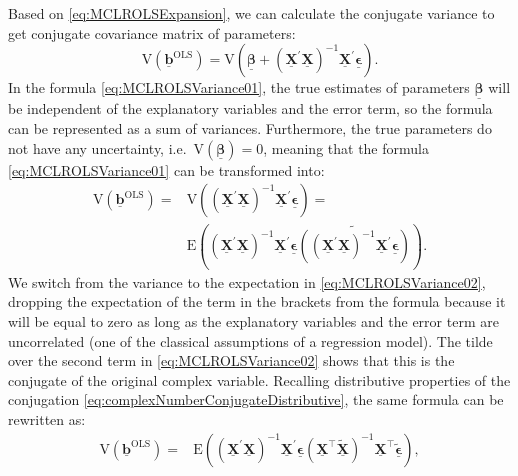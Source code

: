 \documentclass[
]{book}
\begin{document}
Based on \eqref{eq:MCLROLSExpansion}, we can calculate the conjugate variance to get conjugate covariance matrix of parameters:
\begin{equation}
    \mathrm{V}\left( \underline{\boldsymbol{b}}^{\text{OLS}} \right) = \mathrm{V}\left( \underline{\boldsymbol{\beta}} + \left( \underline{\mathbf{X}}^\prime \underline{\mathbf{X}} \right)^{-1} \underline{\mathbf{X}}^\prime \underline{\boldsymbol{\epsilon}} \right) .
    \label{eq:MCLROLSVariance01}
\end{equation}
In the formula \eqref{eq:MCLROLSVariance01}, the true estimates of parameters \(\underline{\boldsymbol{\beta}}\) will be independent of the explanatory variables and the error term, so the formula can be represented as a sum of variances. Furthermore, the true parameters do not have any uncertainty, i.e.~\(\mathrm{V}\left( \underline{\boldsymbol{\beta}} \right) = 0\), meaning that the formula \eqref{eq:MCLROLSVariance01} can be transformed into:
\begin{equation}
    \begin{aligned}
        \mathrm{V}\left( \underline{\boldsymbol{b}}^{\text{OLS}} \right) =
        & \mathrm{V}\left(\left( \underline{\mathbf{X}}^\prime \underline{\mathbf{X}} \right)^{-1} \underline{\mathbf{X}}^\prime \underline{\boldsymbol{\epsilon}} \right) = \\
        & \mathrm{E}\left( \left( \underline{\mathbf{X}}^\prime \underline{\mathbf{X}} \right)^{-1} \underline{\mathbf{X}}^\prime \underline{\boldsymbol{\epsilon}} \widetilde{ \left( \left( \underline{\mathbf{X}}^\prime \underline{\mathbf{X}} \right)^{-1} \underline{\mathbf{X}}^\prime \underline{\boldsymbol{\epsilon}}\right)} \right) .
    \end{aligned}
    \label{eq:MCLROLSVariance02}
\end{equation}
We switch from the variance to the expectation in \eqref{eq:MCLROLSVariance02}, dropping the expectation of the term in the brackets from the formula because it will be equal to zero as long as the explanatory variables and the error term are uncorrelated (one of the classical assumptions of a regression model). The tilde over the second term in \eqref{eq:MCLROLSVariance02} shows that this is the conjugate of the original complex variable. Recalling distributive properties of the conjugation \eqref{eq:complexNumberConjugateDistributive}, the same formula can be rewritten as:
\begin{equation}
    \begin{aligned}
        \mathrm{V}\left( \underline{\boldsymbol{b}}^{\text{OLS}} \right) =
        & \mathrm{E}\left( \left( \underline{\mathbf{X}}^\prime \underline{\mathbf{X}} \right)^{-1} \underline{\mathbf{X}}^\prime \underline{\boldsymbol{\epsilon}} \left( \underline{\mathbf{X}}^\top \tilde{\underline{\mathbf{X}}} \right)^{-1} \underline{\mathbf{X}}^\top \tilde{\underline{\boldsymbol{\epsilon}}} \right) ,
    \end{aligned}
    \label{eq:MCLROLSVariance03}
\end{equation}
\end{document}
